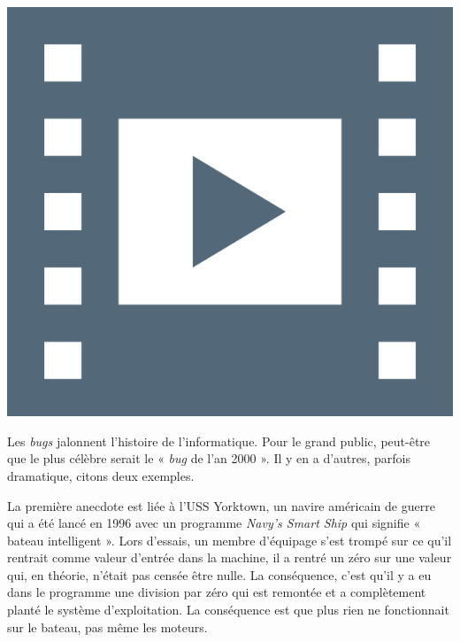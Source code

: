 \begin{marginvideo}
	[\label{vid:VI.7}Histoire de \textup{bugs}.]%
	\href{https://www.youtube.com/watch?v=J0tfaYucSGs}%
	  {\includegraphics[width=\marginparwidth]{./Images/Pictograms/film-strip-dark-electric-blue.png}}%
\end{marginvideo}

Les \textit{bugs} jalonnent l'histoire de l'informatique. Pour le grand public, peut-être que le plus célèbre serait le « \textit{bug} de l'an 2000 ». Il y en a d'autres, parfois dramatique, citons deux exemples.

La première anecdote est liée à l'USS Yorktown, un navire américain de guerre qui a été lancé en 1996 avec un programme \textit{Navy's Smart Ship} qui signifie « bateau intelligent ». Lors d'essais, un membre d'équipage s'est trompé sur ce qu'il rentrait comme valeur d'entrée dans la machine, il a rentré un zéro sur une valeur qui, en théorie, n'était pas censée être nulle. La conséquence, c'est qu'il y a eu dans le programme une division par zéro qui est remontée et a complètement planté le système d'exploitation. La conséquence est que plus rien ne fonctionnait sur le bateau, pas même les moteurs.

